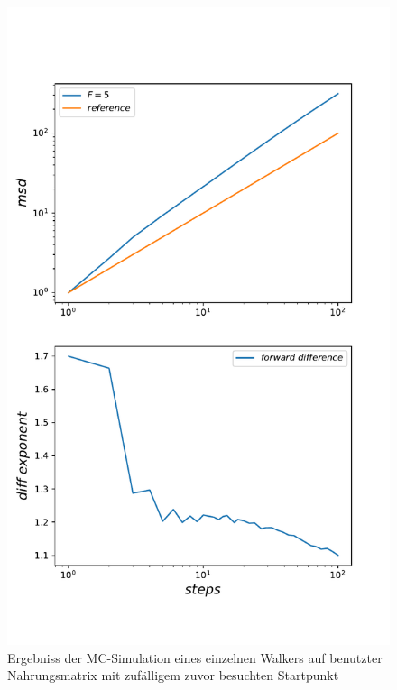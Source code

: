 \documentclass[a4paper, 12pt]{report}
\begin{document}
\begin{figure}[H]
	\centering
	\includegraphics[scale=0.8]{single_walker_on_used_mat_disorderavg.pdf}
	\caption{Ergebniss der MC-Simulation eines einzelnen Walkers auf benutzter Nahrungsmatrix mit zufälligem zuvor besuchten Startpunkt}
\end{figure}

\newpage
\end{document}
